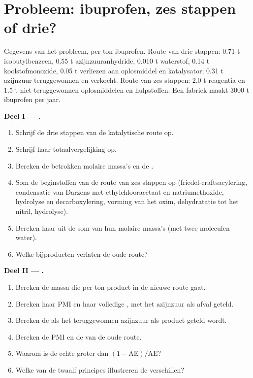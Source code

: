 \section{Probleem: ibuprofen, zes stappen of drie?}

\begin{problem}
\label{pb:b3:green-industrial:1}
Gegevens van het probleem, per ton ibuprofen. Route van drie stappen:
0.71 t isobutylbenzeen, 0.55 t azijnzuuranhydride, 0.010 t waterstof,
0.14 t koolstofmonoxide, 0.05 t verliezen aan oplosmiddel en
katalysator; 0.31 t azijnzuur teruggewonnen en verkocht. Route van zes
stappen: 2.0 t reagentia en 1.5 t niet-teruggewonnen oplosmiddelen en
hulpstoffen. Een fabriek maakt 3000 t ibuprofen per jaar.

\medskip\noindent\textbf{Deel I --- .}
\begin{enumerate}
  \item Schrijf de drie stappen van de katalytische route op.
  \item Schrijf haar totaalvergelijking op.
  \item Bereken de betrokken molaire massa's en de .
  \item Som de beginstoffen van de route van zes stappen op
        (friedel-craftsacylering, condensatie van Darzens met
        ethylchlooracetaat en natriumethoxide, hydrolyse en
        decarboxylering, vorming van het oxim, dehydratatie tot het
        nitril, hydrolyse).
  \item Bereken haar  uit de som van hun molaire massa's (met
        twee moleculen water).
  \item Welke bijproducten verlaten de oude route?
\end{enumerate}

\medskip\noindent\textbf{Deel II --- .}
\begin{enumerate}[resume]
  \item Bereken de massa die per ton product in de nieuwe route gaat.
  \item Bereken haar PMI en haar volledige , met het azijnzuur
        als afval geteld.
  \item Bereken de  als het teruggewonnen azijnzuur als product
        geteld wordt.
  \item Bereken de PMI en de  van de oude route.
  \item Waarom is de echte  groter dan $(1 - \mathrm{AE})/\mathrm{AE}$?
  \item Welke van de twaalf principes illustreren de verschillen?
\end{enumerate}


\end{problem}
